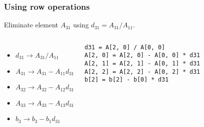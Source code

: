 \begin{frame}[fragile]
  \frametitle{Using row operations}
  Eliminate element $A_{31}$ using $d_{31}=A_{31}/A_{11}$.
  \vfill
  \vfill\pause
  \begin{columns}
  \begin{itemize}
    \item $d_{31}\rightarrow A_{31}/A_{11}$
    \item $A_{31}\rightarrow A_{31}-A_{11}d_{31}$
    \item $A_{32}\rightarrow A_{32}-A_{12}d_{31}$
    \item $A_{33}\rightarrow A_{33}-A_{13}d_{31}$
    \item $b_3   \rightarrow b_3   -b_1   d_{31}$
  \end{itemize}
  \begin{lstlisting}
d31 = A[2, 0] / A[0, 0]
A[2, 0] = A[2, 0] - A[0, 0] * d31
A[2, 1] = A[2, 1] - A[0, 1] * d31
A[2, 2] = A[2, 2] - A[0, 2] * d31
b[2] = b[2] - b[0] * d31    
  \end{lstlisting}
  \end{columns}
\end{frame}

